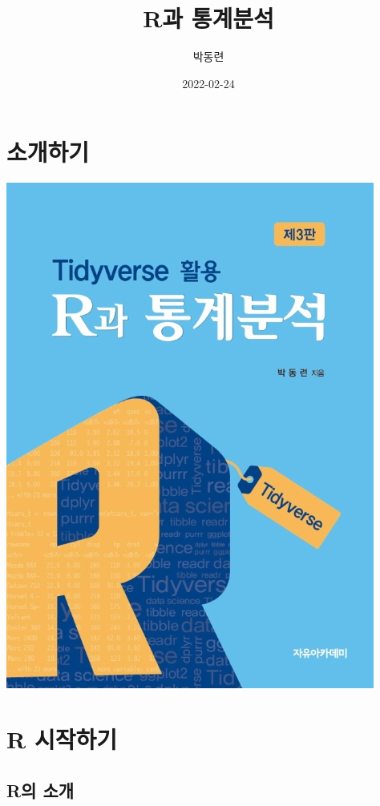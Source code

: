 \documentclass[
]{book}
\title{R과 통계분석}
\author{박동련}
\date{2022-02-24}
\begin{document}
\maketitle

{
\setcounter{tocdepth}{1}
\tableofcontents
}
\hypertarget{uxc18cuxac1cuxd558uxae30}{%
\chapter*{소개하기}\label{uxc18cuxac1cuxd558uxae30}}

\includegraphics{Figure/cover.jpg}

\hypertarget{r-uxc2dcuxc791uxd558uxae30}{%
\chapter{R 시작하기}\label{r-uxc2dcuxc791uxd558uxae30}}

\hypertarget{ruxc758-uxc18cuxac1c}{%
\section{R의 소개}\label{ruxc758-uxc18cuxac1c}}
\end{document}
